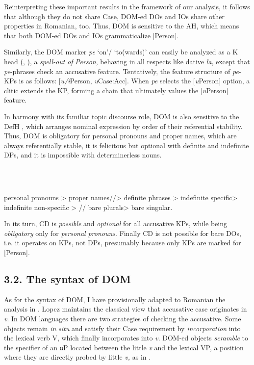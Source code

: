 \documentclass[output=paper,colorlinks,citecolor=brown]{./langscibook}
\begin{document}
Reinterpreting these important results in the framework of our analysis, it follows that although they do not share Case, DOM-ed DOs and IOs share other properties in Romanian, too. Thus, DOM is sensitive to the AH, which means that both DOM-ed DOs and IOs grammaticalize [Person].

Similarly, the DOM marker \textit{pe} ‘on’/ ‘to(wards)’ can easily be analyzed as a K head (\citealt{López2012}, \citealt{HillMardale2017}), a \textit{spell-out} \textit{of} \textit{Person}, behaving in all respects like dative \textit{la}, except that \textit{pe}{}-phrases check an accusative feature. Tentatively, the feature structure of \textit{pe}{}-KPs is as follows: [\textit{u/i}Person, \textit{u}Case:Acc]. When \textit{pe} selects the [\textit{u}Person] option, a clitic extends the KP, forming a chain that ultimately values the [\textit{u}Person] feature. 

In harmony with its familiar topic discourse role, DOM is also sensitive to the DefH , which arranges nominal expression by order of their referential stability. Thus, DOM is obligatory for personal pronouns and proper names, which are always referentially stable, it is felicitous but optional with definite and indefinite DPs, and it is impossible with determinerless nouns.

\ea%
    \label{ex:key:24}
    \gll\\
        \\
    \glt
    \z

          personal pronouns > proper names//> definite phrases > indefinite specific> indefinite non-specific > // bare plurals> bare singular.

In its turn, CD is \textit{possible} and \textit{optional} for all accusative KPs, while being \textit{obligatory} only for \textit{personal} \textit{pronouns}. Finally CD is not possible for bare DOs, i.e. it operates on KPs, not DPs, presumably because only KPs are marked for [Person].

\subsection{\textbf{3.2.} \textbf{The} \textbf{syntax} \textbf{of} \textbf{DOM}}

As for the syntax of DOM, I have provisionally adapted to Romanian the analysis in \citet{López2012}. Lopez maintains the classical view that accusative case originates in \textit{v}. In DOM languages there are two strategies of checking the accusative. Some objects remain \textit{in} \textit{situ} and satisfy their Case requirement by \textit{incorporation} into the lexical verb V, which finally incorporates into \textit{v}. DOM-ed objects \textit{scramble} to the specifier of an αP located between the little \textit{v} and the lexical VP, a position where they are directly probed by little \textit{v,} as in .
\end{document}
